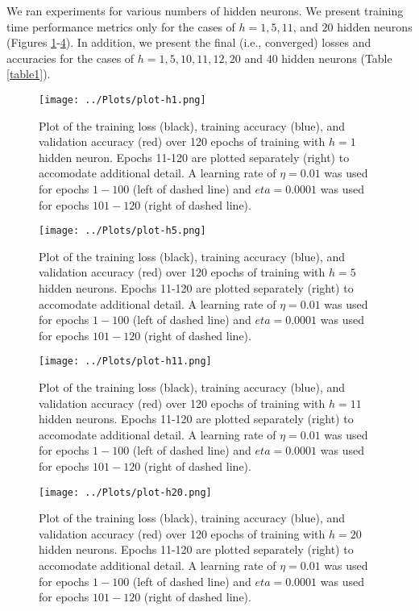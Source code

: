 \documentclass[12pt]{article}
\begin{document}
We ran experiments for various numbers of hidden neurons. We present training time performance metrics only for the cases of $h=1,5,11$, and $20$ hidden neurons (Figures \ref{plot-h1}-\ref{plot-h20}). In addition, we present the final (i.e., converged) losses and accuracies for the cases of $h=1,5,10,11,12,20$ and $40$ hidden neurons (Table \ref{table1}).

\begin{figure}
\centering
\texttt{[image: ../Plots/plot-h1.png]}
\caption{\label{plot-h1} Plot of the training loss (black), training accuracy (blue), and validation accuracy (red) over 120 epochs of training with $h=1$ hidden neuron. Epochs 11-120 are plotted separately (right) to accomodate additional detail. A learning rate of $\eta=0.01$ was used for epochs $1-100$ (left of dashed line) and $eta=0.0001$ was used for epochs $101-120$ (right of dashed line).}
\end{figure}

\begin{figure}
\centering
\texttt{[image: ../Plots/plot-h5.png]}
\caption{\label{plot-h5} Plot of the training loss (black), training accuracy (blue), and validation accuracy (red) over 120 epochs of training with $h=5$ hidden neurons. Epochs 11-120 are plotted separately (right) to accomodate additional detail. A learning rate of $\eta=0.01$ was used for epochs $1-100$ (left of dashed line) and $eta=0.0001$ was used for epochs $101-120$ (right of dashed line).}
\end{figure}

\begin{figure}
\centering
\texttt{[image: ../Plots/plot-h11.png]}
\caption{\label{plot-h11} Plot of the training loss (black), training accuracy (blue), and validation accuracy (red) over 120 epochs of training with $h=11$ hidden neurons. Epochs 11-120 are plotted separately (right) to accomodate additional detail. A learning rate of $\eta=0.01$ was used for epochs $1-100$ (left of dashed line) and $eta=0.0001$ was used for epochs $101-120$ (right of dashed line).}
\end{figure}

\begin{figure}
\centering
\texttt{[image: ../Plots/plot-h20.png]}
\caption{\label{plot-h20} Plot of the training loss (black), training accuracy (blue), and validation accuracy (red) over 120 epochs of training with $h=20$ hidden neurons. Epochs 11-120 are plotted separately (right) to accomodate additional detail. A learning rate of $\eta=0.01$ was used for epochs $1-100$ (left of dashed line) and $eta=0.0001$ was used for epochs $101-120$ (right of dashed line).}
\end{figure}
\end{document}
